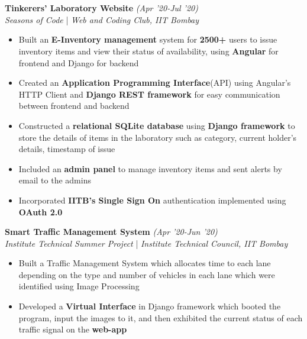 \documentclass{article}
\newcommand{\xfill}[2][1ex]{
	\dimen0=#2\advance\dimen0 by #1
	\leaders\hrule height \dimen0 depth -#1\hfill
}
\begin{document}
\section*{\color{myblue}{{\LARGE Projects}\xfill[0pt]{0.5pt}}}

\vspace{-6pt}




\large\textbf{Tinkerers' Laboratory Website} \hfill{ \textit{(Apr '20-Jul '20)}}
\large \\ \textit{Seasons of Code} | \textit{Web and Coding Club, IIT Bombay}

\vspace{-6pt}

\begin{itemize}[itemsep=-0.4mm, leftmargin=18pt]
	\item Built an \textbf{E-Inventory management} system for \textbf{2500+} users to issue inventory items and view their status of availability, using \textbf{Angular} for frontend and Django for backend
	\item Created an \textbf{Application Programming Interface}(API) using Angular's HTTP Client and  \textbf{Django REST framework} for easy communication between frontend and backend
	\item Constructed a \textbf{relational SQLite database} using \textbf{Django framework} to store the details of items in the laboratory such as category, current holder's details, timestamp of issue
	\item Included an \textbf{admin panel} to manage inventory items and sent alerts by email to the admins
	\item Incorporated \textbf{IITB's Single Sign On} authentication implemented using \textbf{OAuth 2.0}
\end{itemize}

\raggedright

\vspace{-5pt}





\large\textbf{Smart Traffic Management System} \hfill{ \textit{(Apr '20-Jun '20)}}
\large \\  \textit{Institute Technical Summer Project} | \textit{Institute Technical Council, IIT Bombay}

\vspace{-6pt}

\begin{itemize}[itemsep=-0.8mm, leftmargin=18pt]
	\item Built a Traffic Management System which allocates time to each lane depending on the type and number of vehicles in each lane which were identified using Image Processing
	\item Developed a \textbf{Virtual Interface} in Django framework which booted the program, input the images to it, and then exhibited the current status of each traffic signal on the \textbf{web-app}
\end{itemize}
\end{document}
